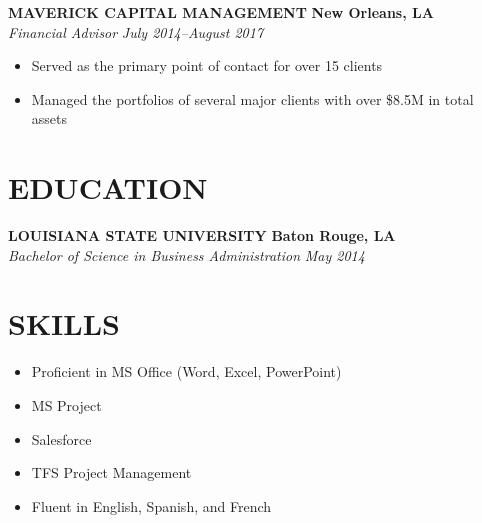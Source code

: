 \documentclass[11pt,letterpaper]{article}
\newcommand{\role}[4]{
  \begin{center}
    \textbf{#1} \hfill \textbf{#2} \\
    \textit{#3} \hfill \textit{#4}
  \end{center}
}
\begin{document}
\role{MAVERICK CAPITAL MANAGEMENT}{New Orleans, LA}{Financial Advisor}{July 2014--August 2017}
\begin{itemize}[leftmargin=*,nosep,topsep=0pt]
  \item Served as the primary point of contact for over 15 clients
  \item Managed the portfolios of several major clients with over \$8.5M in total assets
\end{itemize}

\vspace{1em}
\section{EDUCATION}

\vspace{0.5em}
\role{LOUISIANA STATE UNIVERSITY}{Baton Rouge, LA}{Bachelor of Science in Business Administration}{May 2014}

\vspace{1em}
\section{SKILLS}

\vspace{0.5em}
\begin{itemize}[leftmargin=*,nosep]
  \item Proficient in MS Office (Word, Excel, PowerPoint)
  \item MS Project
  \item Salesforce
  \item TFS Project Management
  \item Fluent in English, Spanish, and French
\end{itemize}
\end{document}
